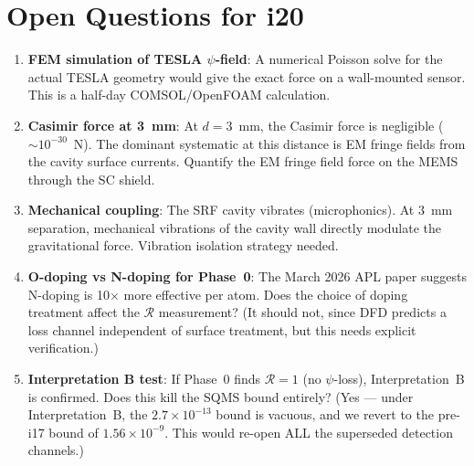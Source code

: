 \documentclass[11pt]{article}
\newcommand{\ee}[1]{\times 10^{#1}}
\theoremstyle{definition}
\theoremstyle{remark}
\begin{document}
\section{Open Questions for i20}

\begin{enumerate}[nosep]
\item \textbf{FEM simulation of TESLA $\psi$-field}: A numerical
  Poisson solve for the actual TESLA geometry would give the
  exact force on a wall-mounted sensor. This is a half-day
  COMSOL/OpenFOAM calculation.

\item \textbf{Casimir force at 3~mm}: At $d = 3$~mm, the Casimir
  force is negligible ($\sim 10^{-30}$~N). The dominant systematic
  at this distance is EM fringe fields from the cavity surface
  currents. Quantify the EM fringe field force on the MEMS
  through the SC shield.

\item \textbf{Mechanical coupling}: The SRF cavity vibrates
  (microphonics). At 3~mm separation, mechanical vibrations of the
  cavity wall directly modulate the gravitational force. Vibration
  isolation strategy needed.

\item \textbf{O-doping vs N-doping for Phase~0}: The March 2026
  APL paper suggests N-doping is 10$\times$ more effective per atom.
  Does the choice of doping treatment affect the $\mathcal{R}$
  measurement? (It should not, since DFD predicts a loss channel
  independent of surface treatment, but this needs explicit verification.)

\item \textbf{Interpretation B test}: If Phase~0 finds $\mathcal{R}
  = 1$ (no $\psi$-loss), Interpretation~B is confirmed. Does this
  kill the SQMS bound entirely? (Yes --- under Interpretation~B,
  the $2.7\ee{-13}$ bound is vacuous, and we revert to the pre-i17
  bound of $1.56\ee{-9}$. This would re-open ALL the superseded
  detection channels.)
\end{enumerate}
\end{document}
